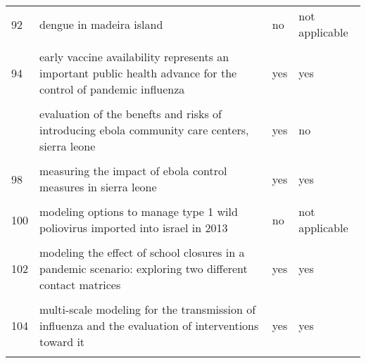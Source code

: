 \documentclass[
]{article}
\begin{document}
\begin{landscape}
\begin{longtable}{l>{\raggedright\arraybackslash}p{9cm}ll}
92 & dengue in madeira island & no & not applicable\\
\cellcolor{gray!6}{93} & \cellcolor{gray!6}{dynamic simulation of a seiqr-v epidemic model based on cellular automata} & \cellcolor{gray!6}{no} & \cellcolor{gray!6}{not applicable}\\
94 & early vaccine availability represents an important public health advance for the control of pandemic influenza & yes & yes\\
\cellcolor{gray!6}{95} & \cellcolor{gray!6}{effectiveness of ebola treatment units and community care centers — liberia, september 23–october 31, 2014} & \cellcolor{gray!6}{yes} & \cellcolor{gray!6}{yes}\\
\addlinespace
96 & evaluation of the benefts and risks of introducing ebola community care centers, sierra leone & yes & no\\
\cellcolor{gray!6}{97} & \cellcolor{gray!6}{evidence for emergency vaccination having played a crucial role to control the 1965/66 foot-and-mouth disease outbreak in switzerland} & \cellcolor{gray!6}{yes} & \cellcolor{gray!6}{no}\\
98 & measuring the impact of ebola control measures in sierra leone & yes & yes\\
\cellcolor{gray!6}{99} & \cellcolor{gray!6}{media impact switching surface during an infectious disease outbreak} & \cellcolor{gray!6}{yes} & \cellcolor{gray!6}{yes}\\
100 & modeling options to manage type 1 wild poliovirus imported into israel in 2013 & no & not applicable\\
\addlinespace
\cellcolor{gray!6}{101} & \cellcolor{gray!6}{modeling the effect of comprehensive interventions on ebola virus transmission} & \cellcolor{gray!6}{yes} & \cellcolor{gray!6}{yes}\\
102 & modeling the effect of school closures in a pandemic scenario: exploring two different contact matrices & yes & yes\\
\cellcolor{gray!6}{103} & \cellcolor{gray!6}{modelling the effect of early detection of ebola} & \cellcolor{gray!6}{no} & \cellcolor{gray!6}{not applicable}\\
104 & multi-scale modeling for the transmission of influenza and the evaluation of interventions toward it & yes & yes\\
\cellcolor{gray!6}{105} & \cellcolor{gray!6}{optimal intervention strategies for a seir control model of ebola epidemics} & \cellcolor{gray!6}{no} & \cellcolor{gray!6}{not applicable}\\

\end{longtable}
\end{landscape}
\end{document}
